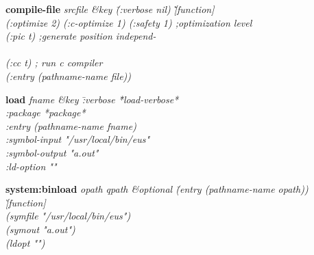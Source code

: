 {\newpage
\clearpage
\samepage 
}

{\newpage
\clearpage
\samepage 
\begin{emtabbing}{\bf compile-file} 
\it srcfile \&key \= (:verbose nil) \hspace{43mm} \=  \`[function]\\  
\> (:optimize 2) (:c-optimize 1) (:safety 1) \> {\rm ;optimization level} \\  
\> (:pic t)  \> {\rm ;generate position independ-} \\  
\> \\  
\> (:cc t) \> {\rm ; run c compiler} \\  
\> (:entry (pathname-name file)) \\  
\rm
\end{emtabbing}
}

{\newpage
\clearpage
\samepage 
\begin{emtabbing}{\bf load} 
\it fname \&key \= :verbose \hspace{20mm} \= *load-verbose* \\  
 \> :package \>  *package* \\  
 \> :entry  \>  (pathname-name fname) \\  
 \> :symbol-input  \> "/usr/local/bin/eus" \\  
 \> :symbol-output \> "a.out" \\  
 \> :ld-option \> ""
\rm
\end{emtabbing}
}

{\newpage
\clearpage
\samepage 
\begin{emtabbing}{\bf system:binload} 
\it opath qpath \&optional \=
(entry (pathname-name opath)) \`[function] \\  
\> (symfile "/usr/local/bin/eus")  \\  
\> (symout "a.out") \\  
\> (ldopt "")\\  
\rm
\end{emtabbing}
}

